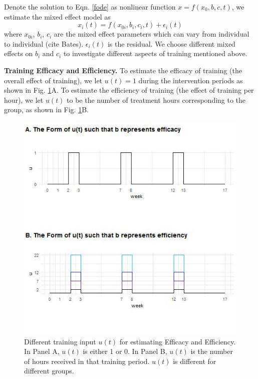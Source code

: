 {Denote the solution to Eqn. \ref{fode} as nonlinear function $ x=f(x_0,b,c,t) $, we estimate the mixed effect model as
\begin{equation}\label{eqn:nonlinear}
	x_i (t)=f(x_{0i},b_i,c_i,t) + \epsilon_i (t)
\end{equation}
where $ x_{0i} $, $ b_i $, $ c_i $ are the mixed effect parameters which can vary from individual to individual (cite Bates).
$ \epsilon_i (t) $ is the residual. 
We choose different mixed effects on $ b_i $ and $ c_i $ to investigate different aspects of training mentioned above.

\textbf{Training Efficacy and Efficiency.}
To estimate the efficacy of training (the overall effect of training), we let $ u(t)=1 $ during the intervention periods as shown in Fig. \ref{fig:dosefigure2}A. 
To estimate the efficiency of training (the effect of training per hour), we let $ u(t) $ to be the number of treatment hours corresponding to the group, as shown in Fig. \ref{fig:dosefigure2}B. 

\begin{figure}
	\centering
	\includegraphics[width=0.7\linewidth]{figures/dosefigure2}
	\caption[Efficacy and Efficiency]{Different training input $u(t)$ for estimating Efficacy and Efficiency. In Panel A, $u(t)$ is either 1 or 0. In Panel B, $u(t)$ is the number of hours received in that training period. $u(t)$ is different for different groups.}
	\label{fig:dosefigure2}
\end{figure}

}
